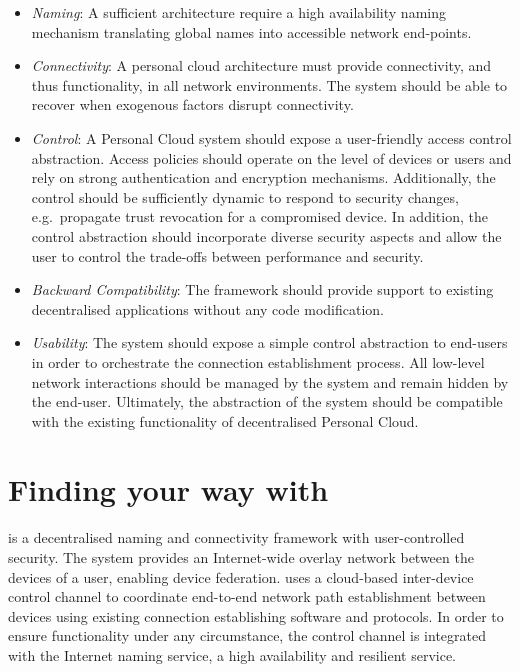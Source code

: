 \begin{itemize}
  \item {\it Naming}\/: A sufficient
    architecture require a high availability naming mechanism translating global
    names into accessible network end-points.    

  \item {\it Connectivity}\/: A personal cloud architecture must provide
    connectivity, and thus functionality, in all network environments.  The
    system should be able to recover when exogenous factors disrupt
    connectivity.     

  \item {\it Control}\/: A Personal Cloud system should expose a user-friendly
    access control abstraction.  Access policies should operate on the level
    of devices or users and rely on strong authentication and encryption
    mechanisms. Additionally, the control should be sufficiently dynamic to
    respond to security changes, e.g.~propagate trust revocation for a
    compromised device. In addition, the control abstraction should
    incorporate diverse security aspects and allow the user to control the
    trade-offs between performance and security.
   
  \item {\it Backward Compatibility}\/: The framework should provide support to
    existing decentralised applications without any code modification.

  \item {\it Usability}\/: The system should expose a simple control abstraction
    to end-users in order to orchestrate the connection establishment
    process. All low-level network interactions should be managed by the
    system and remain hidden by the end-user. Ultimately, the
    abstraction of the system should be compatible with the existing
    functionality of decentralised Personal Cloud. 

 \end{itemize}


\section{Finding your way with \signpost}\label{sec:sp-signpost}

\signpost is a decentralised naming and connectivity framework with
user-controlled security.  The system provides an Internet-wide overlay network
between the devices of a user, enabling device federation.
\signpost uses a cloud-based inter-device control channel to
coordinate end-to-end network path establishment between devices using existing
connection establishing software and protocols.  In order to ensure functionality
under any circumstance, the \signpost control channel is integrated with the
Internet naming service, a high availability and resilient service. 

